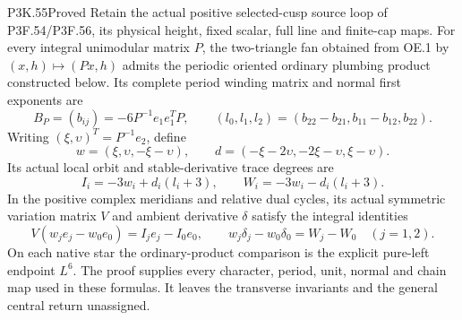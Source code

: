 \begin{statement}{P3K.55}{Proved}
Retain the actual positive selected-cusp source loop of P3F.54/P3F.56,
its physical height, fixed scalar, full line and finite-cap maps. For
every integral unimodular matrix \(P\), the two-triangle fan obtained
from OE.1 by \((x,h)\mapsto(Px,h)\) admits the periodic oriented
ordinary plumbing product constructed below. Its complete period
winding matrix and normal first exponents are
\[
 B_P=(b_{ij})=-6P^{-1}e_1e_1^TP,\qquad
 (l_0,l_1,l_2)=(b_{22}-b_{21},b_{11}-b_{12},b_{22}).
\]
Writing \((\xi,\upsilon)^T=P^{-1}e_2\), define
\[
 w=(\xi,\upsilon,-\xi-\upsilon),\qquad
 d=(-\xi-2\upsilon,-2\xi-\upsilon,\xi-\upsilon).
\]
Its actual local orbit and stable-derivative trace degrees are
\[
 I_i=-3w_i+d_i(l_i+3),\qquad W_i=-3w_i-d_i(l_i+3).
\]
In the positive complex meridians and relative dual cycles, its
actual symmetric variation matrix \(V\) and ambient derivative
\(\delta\) satisfy the integral identities
\[
 V(w_je_j-w_0e_0)=I_je_j-I_0e_0,\qquad
 w_j\delta_j-w_0\delta_0=W_j-W_0\quad(j=1,2).
\]
On each native star the ordinary-product comparison is the explicit
pure-left endpoint \(L^6\). The proof supplies every character,
period, unit, normal and chain map used in these formulas. It leaves
the transverse invariants and the general central return unassigned.
\end{statement}
